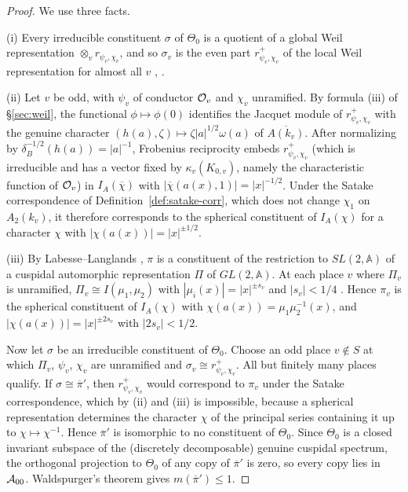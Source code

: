 \documentclass[12pt,letterpaper]{book}
\theoremstyle{plain}
\theoremstyle{definition}
\theoremstyle{remark}
\theoremstyle{remark}
\begin{document}
\begin{proof}
We use three facts.

(i) Every irreducible constituent $\sigma$ of $\Theta_0$ is a quotient of
a global Weil representation $\otimes_v r_{\psi_v,\chi_v}$, and so
$\sigma_v$ is the even part $r^+_{\psi_v,\chi_v}$ of the local Weil
representation for almost all $v$ \cite{GePS}, \cite{Ge2}.

(ii) Let $v$ be odd, with $\psi_v$ of conductor ${\cal O}_v$ and $\chi_v$
unramified. By formula (iii) of \S\ref{sec:weil}, the functional
$\phi\mapsto\phi(0)$ identifies the Jacquet module of $r^+_{\psi_v,\chi_v}$
with the genuine character $(h(a),\zeta)\mapsto\zeta|a|^{1/2}\omega(a)$ of
$\overline{A(k_v)}$. After normalizing by $\delta_B^{-1/2}(h(a))=|a|^{-1}$,
Frobenius reciprocity embeds $r^+_{\psi_v,\chi_v}$ (which is irreducible
and has a vector fixed by $\kappa_v(K_{0,v})$, namely the characteristic
function of ${\cal O}_v$) in $I_A(\overline\chi)$ with
$|\overline\chi(a(x),1)|=|x|^{-1/2}$. Under the Satake correspondence of
Definition~\ref{def:satake-corr}, which does not change $\chi_1$ on
$A_2(k_v)$, it therefore corresponds to the spherical constituent of
$I_A(\chi)$ for a character $\chi$ with $|\chi(a(x))|=|x|^{\pm1/2}$.

(iii) By Labesse--Langlands \cite{LL}, $\pi$ is a constituent of the
restriction to $SL(2,{\mathbb{A}})$ of a cuspidal automorphic
representation $\Pi$ of $GL(2,{\mathbb{A}})$. At each place $v$ where $\Pi_v$
is unramified, $\Pi_v\cong I(\mu_1,\mu_2)$ with
$|\mu_i(x)|=|x|^{\pm s_v}$ and $|s_v|<1/4$ \cite{GJ78}. Hence $\pi_v$ is
the spherical constituent of $I_A(\chi)$ with $\chi(a(x))=\mu_1\mu_2^{-1}(x)$,
and $|\chi(a(x))|=|x|^{\pm 2s_v}$ with $|2s_v|<1/2$.

Now let $\sigma$ be an irreducible constituent of $\Theta_0$. Choose an odd
place $v\notin S$ at which $\Pi_v$, $\psi_v$, $\chi_v$ are unramified and
$\sigma_v\cong r^+_{\psi_v,\chi_v}$. All but finitely many places qualify.
If $\sigma\cong\overline\pi'$, then $r^+_{\psi_v,\chi_v}$ would correspond
to $\pi_v$ under the Satake correspondence, which by (ii) and (iii)
is impossible, because a spherical representation determines the
character $\chi$ of the principal series containing it up to
$\chi\mapsto\chi^{-1}$. Hence $\overline\pi'$ is isomorphic to no
constituent of $\Theta_0$. Since $\Theta_0$ is a closed invariant
subspace of the (discretely decomposable) genuine cuspidal spectrum, the
orthogonal projection to $\Theta_0$ of any copy of $\overline\pi'$ is
zero, so every copy lies in ${\cal A}_{00}$. Waldspurger's theorem gives
$m(\overline\pi')\leq1$.
\end{proof}
\end{document}
